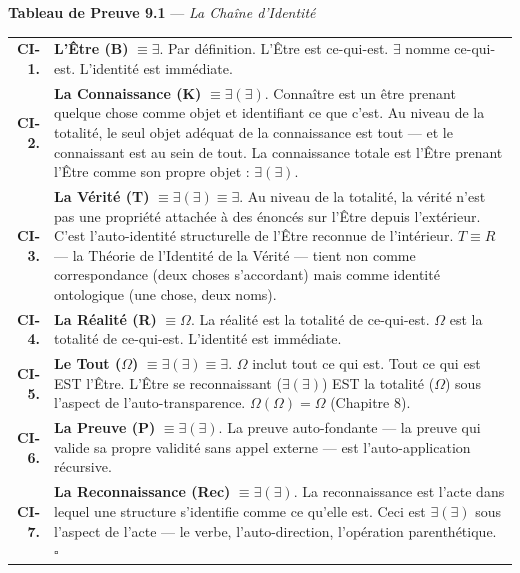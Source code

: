\documentclass[10pt, openany, oneside]{book}
\renewcommand{\footnotesize}{\fontsize{8.5}{11}\selectfont}
\begin{document}
\vspace{1em}

\textbf{Tableau de Preuve 9.1} --- \textit{La Chaîne d'Identité}

\vspace{0.5em}

{\footnotesize
\noindent\begin{tabular}{r p{}}
\textbf{CI-1.} & \textbf{L'Être (B)} $\equiv \exists$. Par définition. L'Être est ce-qui-est. $\exists$ nomme ce-qui-est. L'identité est immédiate. \\[0.5em]
\textbf{CI-2.} & \textbf{La Connaissance (K)} $\equiv \exists(\exists)$. Connaître est un être prenant quelque chose comme objet et identifiant ce que c'est. Au niveau de la totalité, le seul objet adéquat de la connaissance est tout --- et le connaissant est au sein de tout. La connaissance totale est l'Être prenant l'Être comme son propre objet : $\exists(\exists)$. \\[0.5em]
\textbf{CI-3.} & \textbf{La Vérité (T)} $\equiv \exists(\exists) \equiv \exists$. Au niveau de la totalité, la vérité n'est pas une propriété attachée à des énoncés sur l'Être depuis l'extérieur. C'est l'auto-identité structurelle de l'Être reconnue de l'intérieur. $T \equiv R$ --- la Théorie de l'Identité de la Vérité --- tient non comme correspondance (deux choses s'accordant) mais comme identité ontologique (une chose, deux noms). \\[0.5em]
\textbf{CI-4.} & \textbf{La Réalité (R)} $\equiv \Omega$. La réalité est la totalité de ce-qui-est. $\Omega$ est la totalité de ce-qui-est. L'identité est immédiate. \\[0.5em]
\textbf{CI-5.} & \textbf{Le Tout ($\Omega$)} $\equiv \exists(\exists) \equiv \exists$. $\Omega$ inclut tout ce qui est. Tout ce qui est EST l'Être. L'Être se reconnaissant ($\exists(\exists)$) EST la totalité ($\Omega$) sous l'aspect de l'auto-transparence. $\Omega(\Omega) = \Omega$ (Chapitre 8). \\[0.5em]
\textbf{CI-6.} & \textbf{La Preuve (P)} $\equiv \exists(\exists)$. La preuve auto-fondante --- la preuve qui valide sa propre validité sans appel externe --- est l'auto-application récursive. \\[0.5em]
\textbf{CI-7.} & \textbf{La Reconnaissance (Rec)} $\equiv \exists(\exists)$. La reconnaissance est l'acte dans lequel une structure s'identifie comme ce qu'elle est. Ceci est $\exists(\exists)$ sous l'aspect de l'acte --- le verbe, l'auto-direction, l'opération parenthétique. $\square$ \\[0.5em]
\end{tabular}
}
\end{document}
